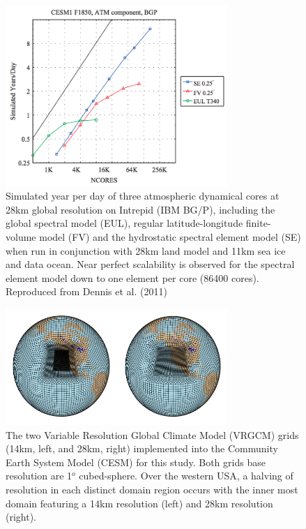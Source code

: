 \documentclass[11pt]{article}
\begin{document}
\begin{figure}
  \begin{center}
  \includegraphics[width=0.75\textwidth]{CAMSEScalability}
  \caption{\label{f1}Simulated year per day of three atmospheric dynamical cores at 28km global resolution on Intrepid (IBM BG/P), including the global spectral model (EUL), regular latitude-longitude finite-volume model (FV) and the hydrostatic spectral element model (SE) when run in conjunction with 28km land model and 11km sea ice and data ocean. Near perfect scalability is observed for the spectral element model down to one element per core (86400 cores). Reproduced from Dennis et al. (2011)}
  \end{center}
\end{figure}

\begin{figure}
  \begin{center}
  \includegraphics[width=0.75\textwidth]{14kmand28kmgrids}
  \caption{\label{f2}The two Variable Resolution Global Climate Model (VRGCM) grids (14km, left, and 28km, right) implemented into the Community Earth System Model (CESM) for this study.  Both grids base resolution are 1$^{o}$ cubed-sphere.  Over the western USA, a halving of resolution in each distinct domain region occurs with the inner most domain featuring a 14km resolution (left) and 28km resolution (right).}
  \end{center}
\end{figure}
\end{document}
